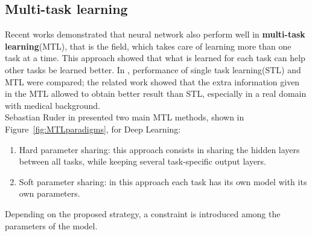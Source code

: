 \subsection{Multi-task learning}
Recent works demonstrated that neural network also perform well in \textbf{multi-task learning}(MTL), that is the field, which takes care of learning more than one task at a time.
This approach showed that what is learned for each task can help other tasks be learned better.
In \cite{MTL}, performance of single task learning(STL) and MTL were compared; the related work showed that the extra information given in the MTL allowed to obtain better result than STL, especially in a real domain with medical background.\\
Sebastian Ruder in \cite{MTLoverview} presented two main MTL methods, shown in Figure~\ref{fig:MTLparadigms}, for Deep Learning: 
\begin{enumerate}[label=\Alph*]
\item Hard parameter sharing: this approach consists in sharing the hidden layers between all tasks, while keeping several task-specific output layers.
\item Soft parameter sharing: in this approach each task has its own model with its own parameters.
\end{enumerate}
Depending on the proposed strategy, a constraint is introduced among the parameters of the model.


